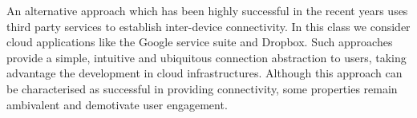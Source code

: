 

An alternative approach which has been highly successful in the recent years
uses third party services to establish inter-device connectivity.  In this class
we consider cloud applications like the Google service suite and Dropbox. Such
approaches provide a simple, intuitive and ubiquitous connection abstraction to
users, taking advantage the development in cloud infrastructures. Although this
approach can be characterised as successful in providing connectivity, some
properties remain ambivalent and demotivate user engagement. 


